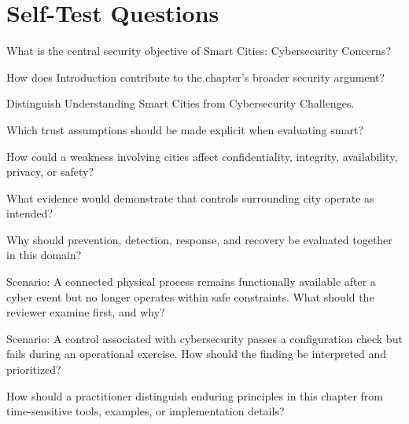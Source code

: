\documentclass[11pt,letterpaper]{article}
\begin{document}
\section*{Self-Test Questions}
\begin{CornellRecallList}
\item What is the central security objective of Smart Cities: Cybersecurity Concerns?
\item How does Introduction contribute to the chapter's broader security argument?
\item Distinguish Understanding Smart Cities from Cybersecurity Challenges.
\item Which trust assumptions should be made explicit when evaluating smart?
\item How could a weakness involving cities affect confidentiality, integrity, availability, privacy, or safety?
\item What evidence would demonstrate that controls surrounding city operate as intended?
\item Why should prevention, detection, response, and recovery be evaluated together in this domain?
\item Scenario: A connected physical process remains functionally available after a cyber event but no longer operates within safe constraints. What should the reviewer examine first, and why?
\item Scenario: A control associated with cybersecurity passes a configuration check but fails during an operational exercise. How should the finding be interpreted and prioritized?
\item How should a practitioner distinguish enduring principles in this chapter from time-sensitive tools, examples, or implementation details?
\end{CornellRecallList}
\end{document}
